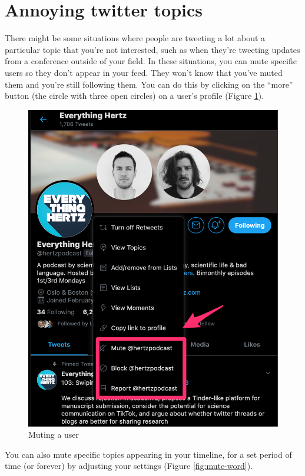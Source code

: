 \documentclass[]{book}
\begin{document}
\hypertarget{annoying-twitter-topics}{%
\section{Annoying twitter topics}\label{annoying-twitter-topics}}

There might be some situations where people are tweeting a lot about a particular topic that you're not interested, such as when they're tweeting updates from a conference outside of your field. In these situations, you can mute specific users so they don't appear in your feed. They won't know that you've muted them and you're still following them. You can do this by clicking on the ``more'' button (the circle with three open circles) on a user's profile (Figure \ref{fig:mute}).

\begin{figure}

{\centering \includegraphics[width=0.8\linewidth]{images/mute} 

}

\caption{Muting a user}\label{fig:mute}
\end{figure}

You can also mute specific topics appearing in your timeline, for a set period of time (or forever) by adjusting your settings (Figure \ref{fig:mute-word}).
\end{document}
